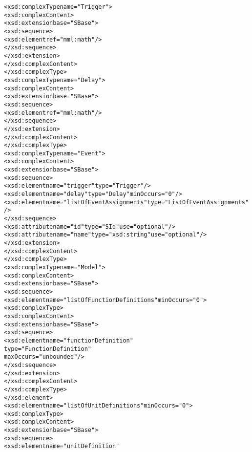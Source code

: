 \begin{alltt}
    <xsd:complexType name="Trigger">
        <xsd:complexContent>
            <xsd:extension base="SBase">
                <xsd:sequence>
                    <xsd:element ref="mml:math"/>
                </xsd:sequence>
            </xsd:extension>
        </xsd:complexContent>
    </xsd:complexType>
    <xsd:complexType name="Delay">
        <xsd:complexContent>
            <xsd:extension base="SBase">
                <xsd:sequence>
                    <xsd:element ref="mml:math"/>
                </xsd:sequence>
            </xsd:extension>
        </xsd:complexContent>
    </xsd:complexType>
    <xsd:complexType name="Event">
        <xsd:complexContent>
            <xsd:extension base="SBase">
                <xsd:sequence>
                    <xsd:element name="trigger" type="Trigger"/>
                    <xsd:element name="delay" type="Delay" minOccurs="0"/>
                    <xsd:element name="listOfEventAssignments" type="ListOfEventAssignments"/>
                </xsd:sequence>
                <xsd:attribute name="id" type="SId" use="optional"/>
                <xsd:attribute name="name" type="xsd:string" use="optional"/>
            </xsd:extension>
        </xsd:complexContent>
    </xsd:complexType>
    <xsd:complexType name="Model">
        <xsd:complexContent>
            <xsd:extension base="SBase">
                <xsd:sequence>
                    <xsd:element name="listOfFunctionDefinitions" minOccurs="0">
                        <xsd:complexType>
                            <xsd:complexContent>
                                <xsd:extension base="SBase">
                                    <xsd:sequence>
                                        <xsd:element name="functionDefinition" 
                                                     type="FunctionDefinition" 
                                                     maxOccurs="unbounded"/>
                                    </xsd:sequence>
                                </xsd:extension>
                            </xsd:complexContent>
                        </xsd:complexType>
                    </xsd:element>
                    <xsd:element name="listOfUnitDefinitions" minOccurs="0">
                        <xsd:complexType>
                            <xsd:complexContent>
                                <xsd:extension base="SBase">
                                    <xsd:sequence>
                                        <xsd:element name="unitDefinition" 

\end{alltt}
